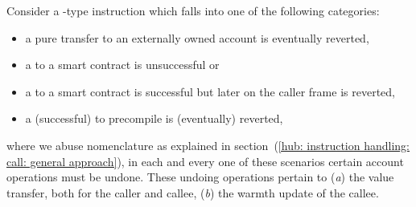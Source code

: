 \begin{center}
\end{center}
Consider a -type instruction which falls into one of the following categories:
\begin{itemize}
	\item a pure transfer to an externally owned account is eventually reverted,
	\item a  to a smart contract is unsuccessful or
	\item a  to a smart contract is successful but later on the caller frame is reverted,
	\item a (successful)  to precompile is (eventually) reverted,
\end{itemize}
where we abuse nomenclature as explained in
section~(\ref{hub: instruction handling: call: general approach}),
in each and every one of these scenarios
certain account operations must be undone.
These undoing operations pertain to
(\emph{a}) the value transfer, both for the caller and callee,
(\emph{b}) the warmth update of the callee.
\begin{description}
		
		
		
		
		
		
\end{description}

